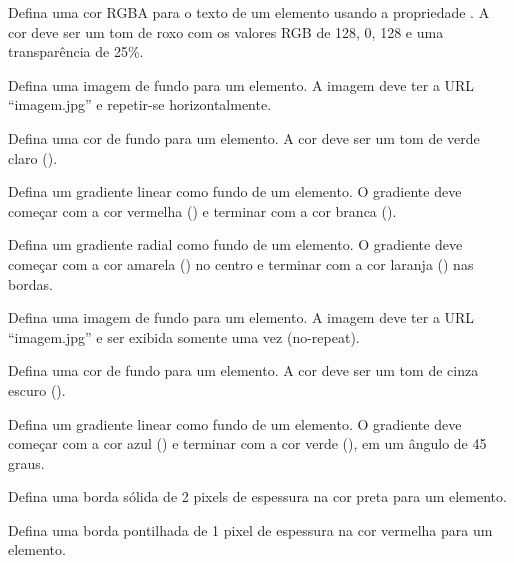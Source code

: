 \begin{exercise}
Defina uma cor RGBA para o texto de um elemento usando a propriedade . A cor deve ser um tom de roxo com os valores RGB de 128, 0, 128 e uma transparência de 25\%.
\end{exercise}

\begin{exercise}
Defina uma imagem de fundo para um elemento. A imagem deve ter a URL ``imagem.jpg'' e repetir-se horizontalmente.
\end{exercise}

\begin{exercise}
Defina uma cor de fundo para um elemento. A cor deve ser um tom de verde claro ().
\end{exercise}

\begin{exercise}
Defina um gradiente linear como fundo de um elemento. O gradiente deve começar com a cor vermelha () e terminar com a cor branca ().
\end{exercise}

\begin{exercise}
Defina um gradiente radial como fundo de um elemento. O gradiente deve começar com a cor amarela () no centro e terminar com a cor laranja () nas bordas.
\end{exercise}

\begin{exercise}
Defina uma imagem de fundo para um elemento. A imagem deve ter a URL ``imagem.jpg'' e ser exibida somente uma vez (no-repeat).
\end{exercise}

\begin{exercise}
Defina uma cor de fundo para um elemento. A cor deve ser um tom de cinza escuro ().
\end{exercise}

\begin{exercise}
Defina um gradiente linear como fundo de um elemento. O gradiente deve começar com a cor azul () e terminar com a cor verde (), em um ângulo de 45 graus.
\end{exercise}

\begin{exercise}
Defina uma borda sólida de 2 pixels de espessura na cor preta para um elemento.
\end{exercise}

\begin{exercise}
Defina uma borda pontilhada de 1 pixel de espessura na cor vermelha para um elemento.
\end{exercise}

